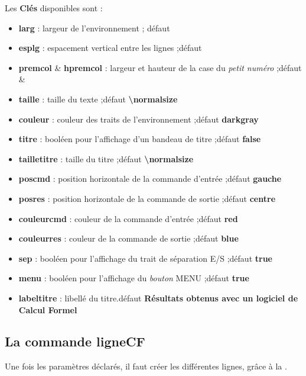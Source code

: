 \documentclass{article}
\newcommand\ctex[1]{\tcbox[vignettelatex]{#1}}
\newcommand\Cle[1]{{\bfseries\sffamily\textlangle #1\textrangle}}
\begin{document}
\begin{codecles}
Les \Cle{Clés} disponibles sont :
\begin{itemize}
	\item \Cle{larg} : largeur de l'environnement ; \hfill{}défaut \Cle{16}
	\item \Cle{esplg} : espacement vertical entre les lignes ;\hfill{}défaut \Cle{2pt}
	\item \Cle{premcol} \& \Cle{hpremcol} : largeur et hauteur de la case du \textit{petit numéro} ;\hfill{}défaut \Cle{0.3} \&  \Cle{0.4}
	\item \Cle{taille} : taille du texte ;\hfill{}défaut \Cle{\textbackslash normalsize}
	\item \Cle{couleur} : couleur des traits de l'environnement ;\hfill{}défaut \Cle{darkgray}
	\item \Cle{titre} : booléen pour l'affichage d'un bandeau de titre ;\hfill{}défaut \Cle{false}
	\item \Cle{tailletitre} : taille du titre ;\hfill{}défaut \Cle{\textbackslash normalsize}
	\item \Cle{poscmd} : position horizontale de la commande d'entrée ;\hfill{}défaut \Cle{gauche}
	\item \Cle{posres} : position horizontale de la commande de sortie ;\hfill{}défaut \Cle{centre}
	\item \Cle{couleurcmd} : couleur de la commande d'entrée ;\hfill{}défaut \Cle{red}
	\item \Cle{couleurres} : couleur de la commande de sortie ;\hfill{}défaut \Cle{blue}
	\item \Cle{sep} : booléen pour l'affichage du trait de séparation E/S ;\hfill{}défaut \Cle{true}
	\item \Cle{menu} : booléen pour l'affichage du \textit{bouton} MENU ;\hfill{}défaut \Cle{true}
	\item \Cle{labeltitre} : libellé du titre.\hfill{}défaut \Cle{Résultats obtenus avec un logiciel de Calcul Formel}
\end{itemize}
\end{codecles}

\subsection{La commande \og ligneCF \fg}

\begin{codeinfo}
Une fois les paramètres déclarés, il faut créer les différentes lignes, grâce à la \ctex{\textbackslash ligneCF}.
\end{codeinfo}
\end{document}
